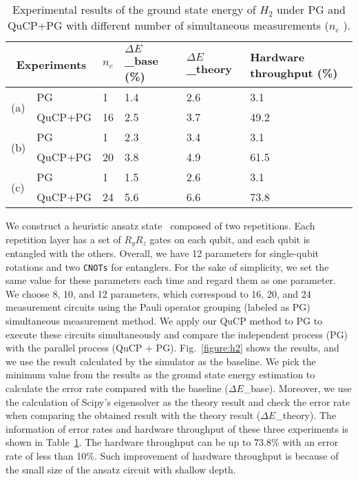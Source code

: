 \documentclass[conference]{IEEEtran}
\begin{document}
\begin {table}[t]
\begin{center}
\caption{Experimental results of the ground state energy of $H_2$ under PG and QuCP+PG with different number of simultaneous measurements ($n_c$ ).}
\label{table:h2}
\begin{tabular}{|l|p{1.2cm}|p{0.4cm}|p{1.3cm}|p{1.3cm}|p{1.8cm}|}
\hline
\multicolumn{2}{|c|}{Experiments} & $n_c$ & $\Delta{E}$\_base (\%) & $\Delta{E}$\_theory & Hardware throughput (\%) \\
\hline
\multirow{2}{*}{(a)} & PG & 1 & 1.4 & 2.6 & 3.1
\\\cline{2-6}
&QuCP+PG & 16 & 2.5 & 3.7 & 49.2 \\
\hline

\multirow{2}{*}{(b)} & PG & 1 & 2.3 & 3.4 & 3.1
\\\cline{2-6}
&QuCP+PG & 20 & 3.8 & 4.9 & 61.5 \\
\hline

\multirow{2}{*}{(c)} & PG & 1 & 1.5 & 2.6 & 3.1 
\\\cline{2-6}
&QuCP+PG & 24 & 5.6 & 6.6 & 73.8 \\
\hline

\end{tabular}
\end{center}
\end{table}

We construct a heuristic ansatz state~\cite{kandala2017hardware} composed of two repetitions. Each repetition layer has a set of $R_yR_z$ gates on each qubit, and each qubit is entangled with the others. Overall, we have 12 parameters for single-qubit rotations and two \texttt{CNOTs} for entanglers. For the sake of simplicity, we set the same value for these parameters each time and regard them as one parameter. We choose 8, 10, and 12 parameters, which correspond to 16, 20, and 24 measurement circuits using the Pauli operator grouping (labeled as PG) simultaneous measurement method. We apply our QuCP method to PG to execute these circuits simultaneously and compare the independent process (PG) with the parallel process (QuCP + PG). Fig.~\ref{figure:h2} shows the results, and we use the result calculated by the simulator as the baseline. We pick the minimum value from the results as the ground state energy estimation to calculate the error rate compared with the baseline ($\Delta{E}$\_base). Moreover, we use the calculation of Scipy's eigensolver as the theory result and check the error rate when comparing the obtained result with the theory result ($\Delta{E}$\_theory). The information of error rates and hardware throughput of these three experiments is shown in Table~\ref{table:h2}. The hardware throughput can be up to 73.8\% with an error rate of less than 10\%. Such improvement of hardware throughput is because of the small size of the ansatz circuit with shallow depth.
\end{document}
